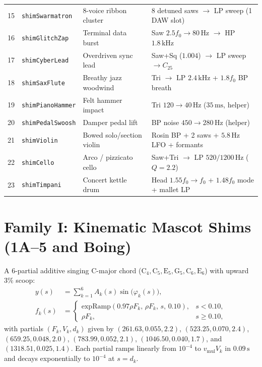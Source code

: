 \begin{table}[htbp]
\begin{tabular}{@{}llll@{}}
15 & \texttt{shimSwarmatron} & 8-voice ribbon cluster & 8 detuned saws $\to$ LP sweep (1 DAW slot) \\
16 & \texttt{shimGlitchZap} & Terminal data burst & Saw $2.5f_0 \to 80\,\text{Hz}$ $\to$ HP $1.8\,\text{kHz}$ \\
17 & \texttt{shimCyberLead} & Overdriven sync lead & Saw+Sq ($1.004$) $\to$ LP sweep $\to C_{25}$ \\
18 & \texttt{shimSaxFlute} & Breathy jazz woodwind & Tri $\to$ LP $2.4\,\text{kHz}$ + $1.8f_0$ BP breath \\
19 & \texttt{shimPianoHammer} & Felt hammer impact & Tri $120 \to 40\,\text{Hz}$ ($35\,\text{ms}$, helper) \\
20 & \texttt{shimPedalSwoosh} & Damper pedal lift & BP noise $450 \to 280\,\text{Hz}$ (helper) \\
21 & \texttt{shimViolin} & Bowed solo/section violin & Rosin BP + 2 saws + $5.8\,\text{Hz}$ LFO + formants \\
22 & \texttt{shimCello} & Arco / pizzicato cello & Saw+Tri $\to$ LP $520/1200\,\text{Hz}$ ($Q=2.2$) \\
23 & \texttt{shimTimpani} & Concert kettle drum & Head $1.55f_0 \to f_0$ + $1.48f_0$ mode + mallet LP \\
\bottomrule
\end{tabular}
\end{table}

\section{Family I: Kinematic Mascot Shims (1A--5 and Boing)}
\label{sec:fam-kin}

\begin{definition}
A 6-partial additive singing C-major chord ($\mathrm{C}_4, \mathrm{C}_5, \mathrm{E}_5, \mathrm{G}_5, \mathrm{C}_6, \mathrm{E}_6$) with upward $3\%$ scoop:
\begin{align}
y(s) &= \sum_{k=1}^{6} A_k(s)\sin\!\big(\varphi_k(s)\big), \\
f_k(s) &=
\begin{cases}
\mathrm{expRamp}(0.97\rho F_k,\, \rho F_k,\, s,\, 0.10), & s < 0.10, \\
\rho F_k, & s \ge 0.10,
\end{cases}
\end{align}
with partials $(F_k, V_k, d_k)$ given by $(261.63, 0.055, 2.2)$, $(523.25, 0.070, 2.4)$, $(659.25, 0.048, 2.0)$, $(783.99, 0.052, 2.1)$, $(1046.50, 0.040, 1.7)$, and $(1318.51, 0.025, 1.4)$. Each partial ramps linearly from $10^{-4}$ to $v_{\mathrm{mul}} V_k$ in $0.09\,\text{s}$ and decays exponentially to $10^{-4}$ at $s = d_k$.
\end{definition}


